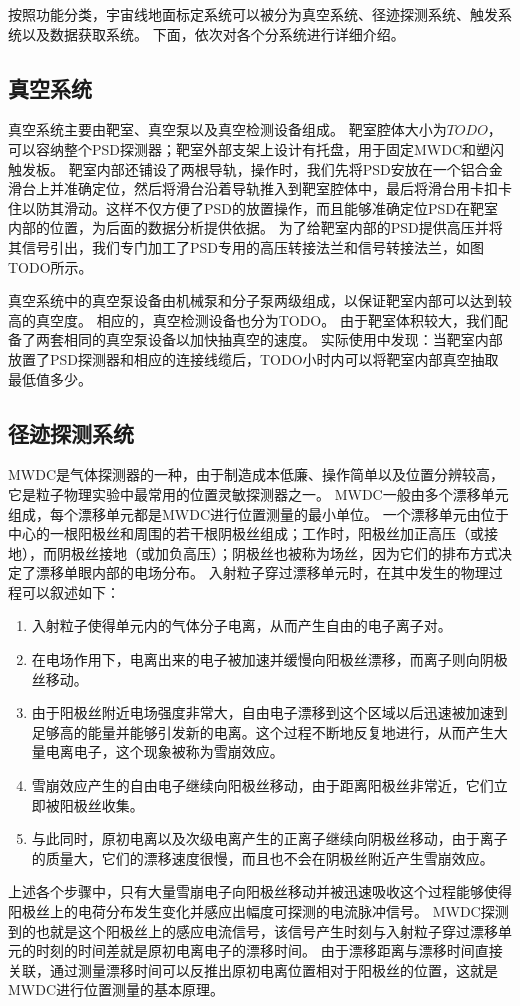 按照功能分类，宇宙线地面标定系统可以被分为真空系统、径迹探测系统、触发系统以及数据获取系统。
下面，依次对各个分系统进行详细介绍。

\subsection{真空系统}
\label{sec:cosmic_ray:vacuum_system}
真空系统主要由靶室、真空泵以及真空检测设备组成。
靶室腔体大小为$TODO$，可以容纳整个PSD探测器；靶室外部支架上设计有托盘，用于固定MWDC和塑闪触发板。
靶室内部还铺设了两根导轨，操作时，我们先将PSD安放在一个铝合金滑台上并准确定位，然后将滑台沿着导轨推入到靶室腔体中，最后将滑台用卡扣卡住以防其滑动。这样不仅方便了PSD的放置操作，而且能够准确定位PSD在靶室内部的位置，为后面的数据分析提供依据。
为了给靶室内部的PSD提供高压并将其信号引出，我们专门加工了PSD专用的高压转接法兰和信号转接法兰，如图TODO所示。

真空系统中的真空泵设备由机械泵和分子泵两级组成，以保证靶室内部可以达到较高的真空度。
相应的，真空检测设备也分为TODO。
由于靶室体积较大，我们配备了两套相同的真空泵设备以加快抽真空的速度。
实际使用中发现：当靶室内部放置了PSD探测器和相应的连接线缆后，TODO小时内可以将靶室内部真空抽取最低值多少。

\subsection{径迹探测系统}
\label{sec:cosmic_ray:tracking_system}
MWDC是气体探测器的一种，由于制造成本低廉、操作简单以及位置分辨较高，它是粒子物理实验中最常用的位置灵敏探测器之一。
MWDC一般由多个漂移单元组成，每个漂移单元都是MWDC进行位置测量的最小单位。
一个漂移单元由位于中心的一根阳极丝和周围的若干根阴极丝组成；工作时，阳极丝加正高压（或接地），而阴极丝接地（或加负高压）；阴极丝也被称为场丝，因为它们的排布方式决定了漂移单眼内部的电场分布。
入射粒子穿过漂移单元时，在其中发生的物理过程可以叙述如下：
\begin{enumerate}
	\item 入射粒子使得单元内的气体分子电离，从而产生自由的电子离子对。
	\item 在电场作用下，电离出来的电子被加速并缓慢向阳极丝漂移，而离子则向阴极丝移动。
	\item 由于阳极丝附近电场强度非常大，自由电子漂移到这个区域以后迅速被加速到足够高的能量并能够引发新的电离。这个过程不断地反复地进行，从而产生大量电离电子，这个现象被称为雪崩效应。
	\item 雪崩效应产生的自由电子继续向阳极丝移动，由于距离阳极丝非常近，它们立即被阳极丝收集。
	\item 与此同时，原初电离以及次级电离产生的正离子继续向阴极丝移动，由于离子的质量大，它们的漂移速度很慢，而且也不会在阴极丝附近产生雪崩效应。
\end{enumerate}
上述各个步骤中，只有大量雪崩电子向阳极丝移动并被迅速吸收这个过程能够使得阳极丝上的电荷分布发生变化并感应出幅度可探测的电流脉冲信号。
MWDC探测到的也就是这个阳极丝上的感应电流信号，该信号产生时刻与入射粒子穿过漂移单元的时刻的时间差就是原初电离电子的漂移时间。
由于漂移距离与漂移时间直接关联，通过测量漂移时间可以反推出原初电离位置相对于阳极丝的位置，这就是MWDC进行位置测量的基本原理。

